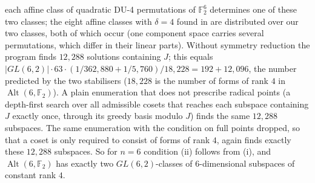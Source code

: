 \documentclass[11pt]{article}
\theoremstyle{definition}
\newcommand{\F}{\mathbb{F}}
\DeclareMathOperator{\Alt}{Alt}
\begin{document}
\begin{itemize}
each affine class of quadratic DU-4 permutations of $\F_2^6$ determines one of these two classes;
the eight affine classes with $\delta=4$ found in \cite{DMB19} are distributed over our two
classes, both of which occur (one component space carries several permutations, which differ in
their linear parts). Without symmetry reduction the program finds
$12{,}288$ solutions containing $J$; this equals
$|GL(6,2)|\cdot63\cdot(1/362{,}880+1/5{,}760)/18{,}228=192+12{,}096$, the number predicted by the
two stabilisers ($18{,}228$ is the number of forms of rank $4$ in $\Alt(6,\F_2)$). A plain
enumeration that does not prescribe radical points (a depth-first search over all admissible
cosets that reaches each subspace containing $J$ exactly once, through its greedy basis modulo
$J$) finds the same $12{,}288$ subspaces. The same enumeration with the condition on full points
dropped, so that a coset is only required to consist of forms of rank $4$, again finds exactly
these $12{,}288$ subspaces. So for $n=6$ condition (ii) follows from (i), and $\Alt(6,\F_2)$ has
exactly two $GL(6,2)$-classes of $6$-dimensional subspaces of constant rank $4$.
\end{itemize}
\end{document}
